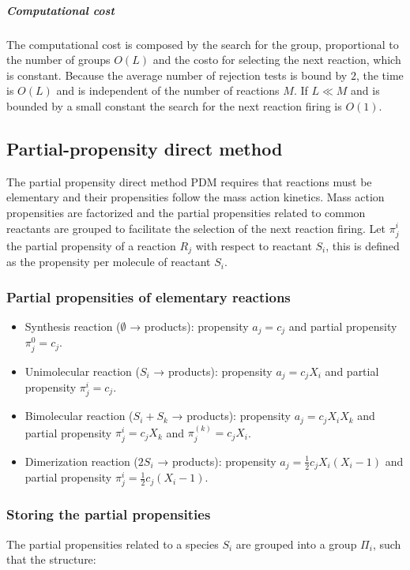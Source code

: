         \subparagraph{Computational cost}
        The computational cost is composed by the search for the group, proportional to the number of groups $O(L)$ and the costo for selecting the next reaction, which is constant.
        Because the average number of rejection tests is bound by $2$, the time is $O(L)$ and is independent of the number of reactions $M$.
        If $L\ll M$ and is bounded by a small constant the search for the next reaction firing is $O(1)$.

  \subsection{Partial-propensity direct method}
  The partial propensity direct method PDM requires that reactions must be elementary and their propensities follow the mass action kinetics.
  Mass action propensities are factorized and the partial propensities related to common reactants are grouped to facilitate the selection of the next reaction firing.
  Let $\pi_j^i$ the partial propensity of a reaction $R_j$ with respect to reactant $S_i$, this is defined as the propensity per molecule of reactant $S_i$.

    \subsubsection{Partial propensities of elementary reactions}

    \begin{itemize}
      \item Synthesis reaction ($\emptyset$ → products): propensity $ a_j =c_j $ and partial propensity $\pi_j^0 = c_j$.
      \item Unimolecular reaction ($ S_i$ → products): propensity $ a_j = c_jX_i $ and partial propensity $\pi_j^i=c_j$.
      \item Bimolecular reaction ($ S_i + S_k$ → products): propensity $ a_j = c_jX_iX_k $ and partial propensity $\pi_j^i = c_jX_k$ and $\pi_j^{(k)} = c_jX_i$.
      \item Dimerization reaction ($2S_i$ → products): propensity $ a_j = \frac{1}{2}c_jX_i(X_i -1) $ and partial propensity $\pi_j^i = \frac{1}{2}c_j(X_i-1)$.
    \end{itemize}

    \subsubsection{Storing the partial propensities}
    The partial propensities related to a species $S_i$ are grouped into  a group $\Pi_i$, such that the structure:

